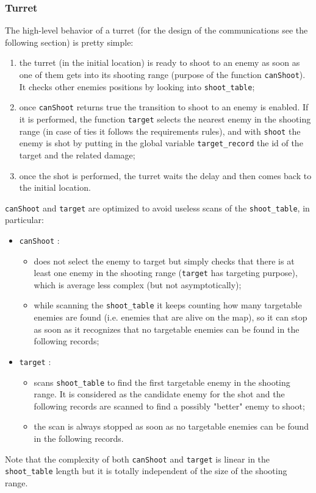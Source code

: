\documentclass[
10pt, %
a4paper, %
oneside, %
headinclude,footinclude, %
BCOR5mm, %
]{scrartcl}
\begin{document}
			\subsubsection{Turret}
				The high-level behavior of a turret (for the design of the communications see the following section) is pretty simple:
				\begin{enumerate}
					\item the turret (in the initial location) is ready to shoot to an enemy as soon as one of them gets into its shooting range (purpose of the function \texttt{canShoot}). It checks other enemies positions by looking into \texttt{shoot\_table};
					\item once \texttt{canShoot} returns true the transition to shoot to an enemy is enabled. If it is performed, the function \texttt{target} selects the nearest enemy in the shooting range (in case of ties it follows the requirements rules), and with \texttt{shoot} the enemy is shot by putting in the global variable \texttt{target\_record} the id of the target and the related damage;
					\item once the shot is performed, the turret waits the delay and then comes back to the initial location.
				\end{enumerate}
				\texttt{canShoot} and \texttt{target} are optimized to avoid useless scans of the \texttt{shoot\_table}, in particular:
				\begin{itemize}
					\item \texttt{canShoot} :
						\begin{itemize}
							\item does not select the enemy to target but simply checks that there is at least one enemy in the shooting range (\texttt{target} has targeting purpose), which is average less complex (but not asymptotically);
							\item while scanning the \texttt{shoot\_table} it keeps counting how many targetable enemies are found (i.e. enemies that are alive on the map), so it can stop as soon as it recognizes that no targetable enemies can be found in the following records;
						\end{itemize}
					\item \texttt{target} :
						\begin{itemize}
							\item scans \texttt{shoot\_table} to find the first targetable enemy in the shooting range. It is considered as the candidate enemy for the shot and the following records are scanned to find a possibly "better" enemy to shoot;
							\item the scan is always stopped as soon as no targetable enemies can be found in the following records.
						\end{itemize}
				\end{itemize}
				Note that the complexity of both \texttt{canShoot} and \texttt{target} is linear in the \texttt{shoot\_table} length but it is totally independent of the size of the shooting range.
				
\end{document}
